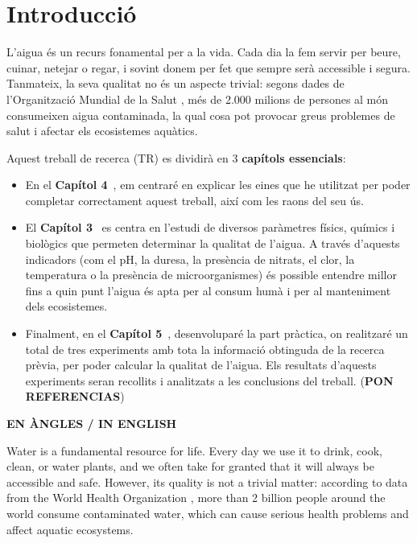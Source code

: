 \chapter{Introducció}

L’aigua és un recurs fonamental per a la vida. Cada dia la fem servir per beure, cuinar, netejar o regar, i sovint donem per fet que sempre serà accessible i segura. Tanmateix, la seva qualitat no és un aspecte trivial: segons dades de l’Organització Mundial de la Salut \cite{OrgaMS}, més de 2.000 milions de persones al món consumeixen aigua contaminada, la qual cosa pot provocar greus problemes de salut i afectar els ecosistemes aquàtics.

Aquest treball de recerca (TR) es dividirà en 3 \textbf{capítols essencials}:

\begin{itemize}
  \item En el \textbf{Capítol 4}~, em centraré en explicar les eines que he utilitzat per poder completar correctament aquest treball, així com les raons del seu ús.

  \item El \textbf{Capítol 3}~ es centra en l’estudi de diversos paràmetres físics, químics i biològics que permeten determinar la qualitat de l’aigua. A través d’aquests indicadors (com el pH, la duresa, la presència de nitrats, el clor, la temperatura o la presència de microorganismes) és possible entendre millor fins a quin punt l’aigua és apta per al consum humà i per al manteniment dels ecosistemes.

  \item Finalment, en el \textbf{Capítol 5}~, desenvoluparé la part pràctica, on realitzaré un total de tres experiments amb tota la informació obtinguda de la recerca prèvia, per poder calcular la qualitat de l’aigua. Els resultats d’aquests experiments seran recollits i analitzats a les conclusions del treball. (\textbf{PON REFERENCIAS})
\end{itemize}

\clearpage

\textbf{EN ÀNGLES / IN ENGLISH}

Water is a fundamental resource for life. Every day we use it to drink, cook, clean, or water plants, and we often take for granted that it will always be accessible and safe. However, its quality is not a trivial matter: according to data from the World Health Organization \cite{OrgaMS}, more than 2 billion people around the world consume contaminated water, which can cause serious health problems and affect aquatic ecosystems.

